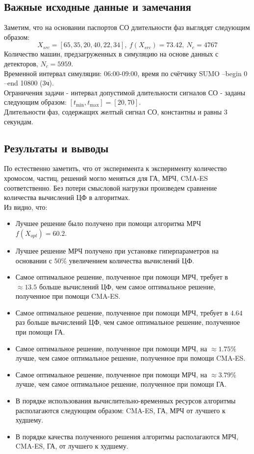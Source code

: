 \subsection{Важные исходные данные и замечания}
Заметим, что на основании паспортов СО длительности фаз выглядят следующим образом:
\begin{equation}
	X_{src} = [65, 35, 20, 40, 22, 34], \ f(X_{src}) = 73.42, \ N_{e} = 4767\label{eq:src}
\end{equation}
Количество машин, предзагруженных в симуляцию на основе данных с детекторов, $N_c = 5959$.\\
Временной интервал симуляции: 06:00-09:00, время по счётчику SUMO --begin 0 --end 10800 (3ч).\\
Ограничения задачи - интервал допустимой длительности сигналов СО - заданы следующим образом: $[t_{\min}, t_{\max}] = [20, 70]$.\\
Длительности фаз, содержащих желтый сигнал СО, константны и равны 3 секундам.
\subsection{Результаты и выводы}
По  естественно заметить, что от эксперимента к эксперименту количество  хромосом, частиц, решений могло меняться для ГА, МРЧ, CMA-ES соответственно. Без потери смысловой нагрузки произведем сравнение количества вычислений ЦФ в алгоритмах.\\


Из  видно, что:
\begin{itemize}
	\item Лучшее решение было получено при помощи алгоритма МРЧ $f(X_{opt}) = 60.2$.
	\item Лучшее решение МРЧ получено при установке гиперпараметров на основании  с $50\%$ увеличением количества вычислений ЦФ.
	\item Самое оптимальное решение, полученное при помощи МРЧ, требует в $\approx 13.5$ больше вычислений ЦФ, чем самое оптимальное решение, полученное при помощи CMA-ES.
	\item Самое оптимальное решение, полученное при помощи МРЧ, требует в $4.64$ раз больше вычислений ЦФ, чем самое оптимальное решение, полученное при помощи ГА.
	\item Самое оптимальное решение, полученное при помощи МРЧ, на $\approx 1.75\%$ лучше, чем самое оптимальное решение, полученное при помощи CMA-ES.
	\item Самое оптимальное решение, полученное при помощи МРЧ, на $\approx 3.79\%$ лучше, чем самое оптимальное решение, полученное при помощи ГА.
	\item В порядке использования вычислительно-временных ресурсов алгоритмы располагаются следующим образом: CMA-ES, ГА, МРЧ от лучшего к худшему.
	\item В порядке качества полученного решения алгоритмы располагаются 
	МРЧ, CMA-ES, ГА,  от лучшего к худшему.
\end{itemize}

